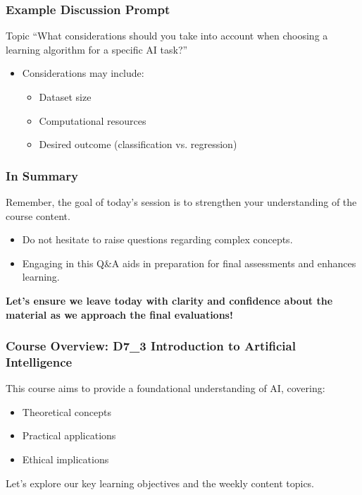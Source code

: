 \documentclass[aspectratio=169]{beamer}
\begin{document}
\begin{frame}[fragile]
    \frametitle{Example Discussion Prompt}
    \begin{block}{Topic}
        “What considerations should you take into account when choosing a learning algorithm for a specific AI task?”
    \end{block}
    \begin{itemize}
        \item Considerations may include:
        \begin{itemize}
            \item Dataset size
            \item Computational resources
            \item Desired outcome (classification vs. regression)
        \end{itemize}
    \end{itemize}
\end{frame}

\begin{frame}[fragile]
    \frametitle{In Summary}
    Remember, the goal of today’s session is to strengthen your understanding of the course content. 
    \begin{itemize}
        \item Do not hesitate to raise questions regarding complex concepts.
        \item Engaging in this Q\&A aids in preparation for final assessments and enhances learning.
    \end{itemize}
    \textbf{Let’s ensure we leave today with clarity and confidence about the material as we approach the final evaluations!}
\end{frame}

\begin{frame}[fragile]
    \frametitle{Course Overview: D7\_3 Introduction to Artificial Intelligence}
    This course aims to provide a foundational understanding of AI, covering:
    \begin{itemize}
        \item Theoretical concepts
        \item Practical applications
        \item Ethical implications
    \end{itemize}
    Let's explore our key learning objectives and the weekly content topics.
\end{frame}
\end{document}
